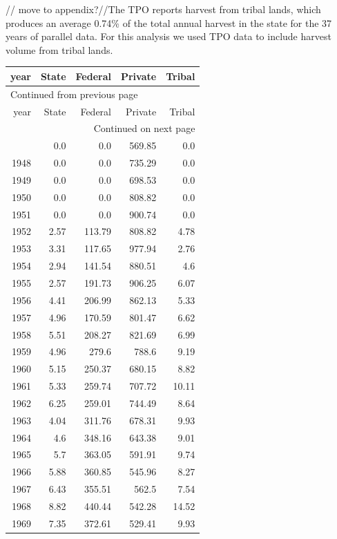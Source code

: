 \documentclass[a4paper]{article}
\begin{document}
// move to appendix?//The TPO reports harvest from tribal lands, which produces an average 0.74\% of the total
annual harvest in the state for the 37 years of parallel data. For
this analysis we used TPO data to include harvest volume from tribal lands. 


\begin{longtable}{rrrrr}
year & State & Federal & Private & Tribal\\
\hline
\endfirsthead
\multicolumn{5}{l}{Continued from previous page} \\
\hline

year & State & Federal & Private & Tribal \\

\hline
\endhead
\hline\multicolumn{5}{r}{Continued on next page} \\
\endfoot
\endlastfoot
\hline
1947 & 0.0 & 0.0 & 569.85 & 0.0\\
1948 & 0.0 & 0.0 & 735.29 & 0.0\\
1949 & 0.0 & 0.0 & 698.53 & 0.0\\
1950 & 0.0 & 0.0 & 808.82 & 0.0\\
1951 & 0.0 & 0.0 & 900.74 & 0.0\\
1952 & 2.57 & 113.79 & 808.82 & 4.78\\
1953 & 3.31 & 117.65 & 977.94 & 2.76\\
1954 & 2.94 & 141.54 & 880.51 & 4.6\\
1955 & 2.57 & 191.73 & 906.25 & 6.07\\
1956 & 4.41 & 206.99 & 862.13 & 5.33\\
1957 & 4.96 & 170.59 & 801.47 & 6.62\\
1958 & 5.51 & 208.27 & 821.69 & 6.99\\
1959 & 4.96 & 279.6 & 788.6 & 9.19\\
1960 & 5.15 & 250.37 & 680.15 & 8.82\\
1961 & 5.33 & 259.74 & 707.72 & 10.11\\
1962 & 6.25 & 259.01 & 744.49 & 8.64\\
1963 & 4.04 & 311.76 & 678.31 & 9.93\\
1964 & 4.6 & 348.16 & 643.38 & 9.01\\
1965 & 5.7 & 363.05 & 591.91 & 9.74\\
1966 & 5.88 & 360.85 & 545.96 & 8.27\\
1967 & 6.43 & 355.51 & 562.5 & 7.54\\
1968 & 8.82 & 440.44 & 542.28 & 14.52\\
1969 & 7.35 & 372.61 & 529.41 & 9.93\\

\end{longtable}
\end{document}
